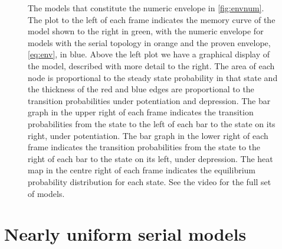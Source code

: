 \documentclass[12pt]{article}
\newcommand{\aligntop}[1]{\adjustbox{valign=t}{#1}}
\newenvironment{myenuma}{\begin{inparaenum}[(a)]}{\end{inparaenum}}
\begin{document}
\begin{figure}[tbp]
\begin{myenuma}
  \end{myenuma}
  \caption[Optimal models]{The models that constitute the numeric envelope in \autoref{fig:envnum}.
  The plot to the left of each frame indicates the memory curve of the model shown to the right in green, with the numeric envelope for models with the serial topology in orange and the proven envelope, \eqref{eq:env}, in blue.
  Above the left plot we have a graphical display of the model, described with more detail to the right.
  The area of each node is proportional to the steady state probability in that state and the thickness of the red and blue edges are proportional to the transition probabilities under potentiation and depression.
  The bar graph in the upper right of each frame indicates the transition probabilities from the state to the left of each bar to the state on its right, under potentiation.
  The bar graph in the lower right of each frame indicates the transition probabilities from the state to the right of each bar to the state on its left, under depression.
  The heat map in the centre right of each frame indicates the equilibrium probability distribution for each state.
  See the video for the full set of models.}\label{fig:envvid}
\end{figure}


\section{Nearly uniform serial models}\label{sec:serial}
\end{document}
